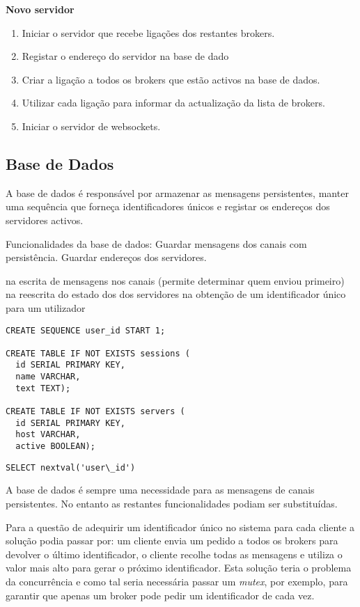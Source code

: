 \hl{}

\textbf{Novo servidor}
\begin{enumerate}
\item Iniciar o servidor que recebe ligações dos restantes brokers.
\item Registar o endereço do servidor na base de dado
\item Criar a ligação a todos os brokers que estão activos na base de dados.
\item Utilizar cada ligação para informar da actualização da lista de brokers.
\item Iniciar o servidor de websockets.
\end{enumerate}


\subsection{Base de Dados}
A base de dados é responsável por armazenar as mensagens persistentes, manter uma sequência que forneça identificadores únicos e registar os endereços dos servidores activos.

Funcionalidades da base de dados:
Guardar mensagens dos canais com persistência.
Guardar endereços dos servidores.

na escrita de mensagens nos canais (permite determinar quem enviou primeiro)
na reescrita do estado dos dos servidores
na obtenção de um identificador único para um utilizador

\renewcommand*{\lstlistingname}{SQL}
\begin{lstlisting}
CREATE SEQUENCE user_id START 1;

CREATE TABLE IF NOT EXISTS sessions (
  id SERIAL PRIMARY KEY,
  name VARCHAR,
  text TEXT);

CREATE TABLE IF NOT EXISTS servers (
  id SERIAL PRIMARY KEY,
  host VARCHAR,
  active BOOLEAN);
\end{lstlisting}

\begin{lstlisting}
SELECT nextval('user\_id')
\end{lstlisting}


A base de dados é sempre uma necessidade para as mensagens de canais persistentes.
No entanto as restantes funcionalidades podiam ser substituídas.

Para a questão de adequirir um identificador único no sistema para cada cliente a solução podia passar por:
um cliente envia um pedido a todos os brokers para devolver o último identificador, o cliente recolhe todas as mensagens e utiliza o valor mais alto para gerar o próximo identificador. Esta solução teria o problema da concurrência e como tal seria necessária passar um \textit{mutex}, por exemplo, para garantir que apenas um broker pode pedir um identificador de cada vez.

